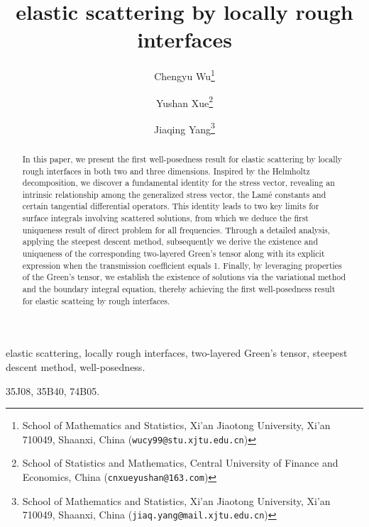 \documentclass[final,reqno]{siamltex}
\begin{document}
\renewcommand{\theequation}{\arabic{section}.\arabic{equation}}

\title{\bf elastic scattering by locally rough interfaces}
\author{
Chengyu Wu\thanks{School of Mathematics and Statistics, Xi'an Jiaotong University,
	Xi'an 710049, Shaanxi, China ({\tt wucy99@stu.xjtu.edu.cn})}
\and
Yushan Xue\thanks{School of Statistics and Mathematics, Central University of Finance and Economics, China ({\tt cnxueyushan@163.com})}
\and
Jiaqing Yang\thanks{School of Mathematics and Statistics, Xi'an Jiaotong University,
	Xi'an 710049, Shaanxi, China ({\tt jiaq.yang@mail.xjtu.edu.cn})}
 }
\date{}
\maketitle


\begin{abstract}
  In this paper, we present the first well-posedness result for elastic scattering by locally rough interfaces in both two and three dimensions. Inspired by the Helmholtz decomposition, we discover a fundamental identity for the stress vector, revealing an intrinsic relationship among the generalized stress vector, the Lamé constants and certain tangential differential operators. This identity leads to two key limits for surface integrals involving scattered solutions, from which we deduce the first uniqueness result of direct problem for all frequencies. Through a detailed analysis, applying the steepest descent method, subsequently we derive the existence and uniqueness of the corresponding two-layered Green's tensor along with its explicit expression when the transmission coefficient equals 1. Finally, by leveraging properties of the Green's tensor, we establish the existence of solutions via the variational method and the boundary integral equation, thereby achieving the first well-posedness result for elastic scatteing by rough interfaces. 
\end{abstract}

\begin{keywords}
elastic scattering, locally rough interfaces, two-layered Green's tensor, steepest descent method, well-posedness. 
\end{keywords}

\begin{AMS}
35J08, 35B40, 74B05. 
\end{AMS}

\pagestyle{myheadings}
\thispagestyle{plain}
\end{document}
